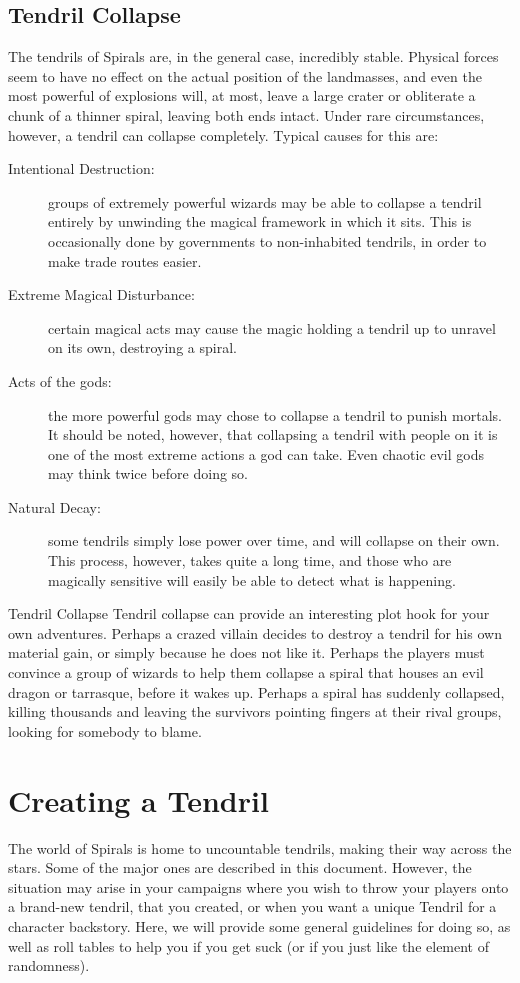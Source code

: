 \begin{multicols*}{2}
\subsection*{Tendril Collapse}
The tendrils of Spirals are, in the general case, incredibly stable.
Physical forces seem to have no effect on the actual position of the landmasses, and even the most powerful of explosions will, at most, leave a large crater or obliterate a chunk of a thinner spiral, leaving both ends intact.
Under rare circumstances, however, a tendril can collapse completely.
Typical causes for this are:
\begin{description}
\item[Intentional Destruction:] groups of extremely powerful wizards may be able to collapse a tendril entirely by unwinding the magical framework in which it sits. This is occasionally done by governments to non-inhabited tendrils, in order to make trade routes easier.
\item[Extreme Magical Disturbance:] certain magical acts may cause the magic holding a tendril up to unravel on its own, destroying a spiral.
\item[Acts of the gods:] the more powerful gods may chose to collapse a tendril to punish mortals. It should be noted, however, that collapsing a tendril with people on it is one of the most extreme actions a god can take. Even chaotic evil gods may think twice before doing so.
\item[Natural Decay:] some tendrils simply lose power over time, and will collapse on their own. This process, however, takes quite a long time, and those who are magically sensitive will easily be able to detect what is happening. 
\end{description}

\begin{adventureidea}{Tendril Collapse}
Tendril collapse can provide an interesting plot hook for your own adventures.
Perhaps a crazed villain decides to destroy a tendril for his own material gain, or simply because he does not like it.
Perhaps the players must convince a group of wizards to help them collapse a spiral that houses an evil dragon or tarrasque, before it wakes up.
Perhaps a spiral has suddenly collapsed, killing thousands and leaving the survivors pointing fingers at their rival groups, looking for somebody to blame.
\end{adventureidea}


\section{Creating a Tendril}
The world of Spirals is home to uncountable tendrils, making their way across the stars.
Some of the major ones are described in this document.
However, the situation may arise in your campaigns where you wish to throw your players onto a brand-new tendril, that you created, or when you want a unique Tendril for a character backstory.
Here, we will provide some general guidelines for doing so, as well as roll tables to help you if you get suck (or if you just like the element of randomness).


\end{multicols*}
